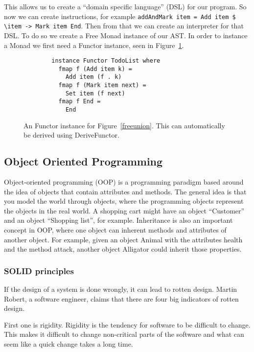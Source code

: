 \documentclass[12pt]{article}
\theoremstyle{definition}
\theoremstyle{theorem}
\begin{document}
This allows us to create a ``domain specific language'' (DSL) for our program.
So now we can create instructions, for example \texttt{addAndMark item = Add
item \$ \textbackslash item -> Mark item End}. Then from that we can create an
interpreter for that DSL. To do so we create a Free Monad instance of our AST.
In order to instance a Monad we first need a Functor instance, seen in
Figure~\ref{freefunctor}.

\begin{figure}[H]
    \begin{lstlisting}
        instance Functor TodoList where
          fmap f (Add item k) = 
            Add item (f . k)
          fmap f (Mark item next) = 
            Set item (f next)
          fmap f End = 
            End
    \end{lstlisting}
    \label{freefunctor}
    \caption{An Functor instance for Figure~\ref{freeunion}. This can
    automatically be derived using DeriveFunctor.}
\end{figure}




\subsection{Object Oriented Programming}\label{oop}

Object-oriented programming (OOP) is a programming paradigm based around the
idea of objects that contain attributes and methods. The general idea is that
you model the world through objects, where the programming objects represent the
objects in the real world. A shopping cart might have an object ``Customer'' and
an object ``Shopping list'', for example. Inheritance is also an important
concept in OOP, where one object can inherent methods and attributes of another
object.  For example, given an object Animal with the attributes health and the
method attack, another object Alligator could inherit those
properties.~\cite{Gamma:1995:DPE:186897}

\subsubsection{SOLID principles}

If the design of a system is done wrongly, it can lead to rotten design. Martin
Robert, a software engineer, claims that there are four big indicators of rotten
design.

First one is rigidity. Rigidity is the tendency for software to be difficult to
change. This makes it difficult to change non-critical parts of the software and
what can seem like a quick change takes a long time.
\end{document}
